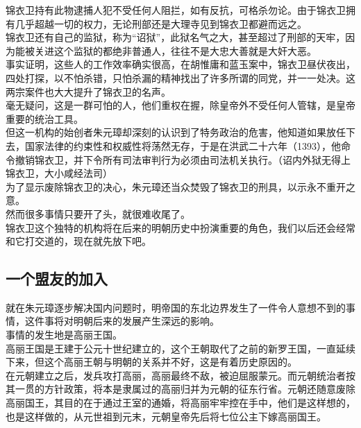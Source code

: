\begin{multicols}{\theparacolNo}
锦衣卫持有此物逮捕人犯不受任何人阻拦，如有反抗，可格杀勿论。由于锦衣卫拥有几乎超越一切的权力，无论刑部还是大理寺见到锦衣卫都避而远之。\\

锦衣卫还有自己的监狱，称为“诏狱”，此狱名气之大，甚至超过了刑部的天牢，因为能被关进这个监狱的都绝非普通人，往往不是大忠大善就是大奸大恶。\\

事实证明，这些人的工作效率确实很高，在胡惟庸和蓝玉案中，锦衣卫昼伏夜出，四处打探，以不怕杀错，只怕杀漏的精神找出了许多所谓的同党，并一一处决。这两宗案件也大大提升了锦衣卫的名声。\\

毫无疑问，这是一群可怕的人，他们重权在握，除皇帝外不受任何人管辖，是皇帝重要的统治工具。\\

但这一机构的始创者朱元璋却深刻的认识到了特务政治的危害，他知道如果放任下去，国家法律的约束性和权威性将荡然无存，于是在洪武二十六年（1393），他命令撤销锦衣卫，并下令所有司法审判行为必须由司法机关执行。（诏内外狱无得上锦衣卫，大小咸经法司）\\

为了显示废除锦衣卫的决心，朱元璋还当众焚毁了锦衣卫的刑具，以示永不重开之意。\\

然而很多事情只要开了头，就很难收尾了。\\

锦衣卫这个独特的机构将在后来的明朝历史中扮演重要的角色，我们以后还会经常和它打交道的，现在就先放下吧。\\

\subsection{一个盟友的加入}
就在朱元璋逐步解决国内问题时，明帝国的东北边界发生了一件令人意想不到的事情，这件事将对明朝后来的发展产生深远的影响。\\

事情的发生地是高丽王国。\\

高丽王国是王建于公元十世纪建立的，这个王朝取代了之前的新罗王国，一直延续下来，但这个高丽王朝与明朝的关系并不好，这是有着历史原因的。\\

在元朝建立之后，发兵攻打高丽，高丽最终不敌，被迫屈服蒙元。而元朝统治者按其一贯的方针政策，将本是隶属过的高丽归并为元朝的征东行省。元朝还随意废除高丽国王，其目的在于通过王室的通婚，将高丽牢牢控在手中，他们是这样想的，也是这样做的，从元世祖到元末，元朝皇帝先后将七位公主下嫁高丽国王。\\


\end{multicols}
